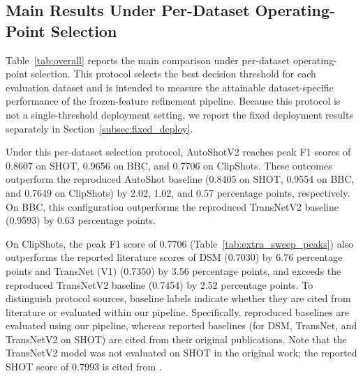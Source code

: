 \subsection{Main Results Under Per-Dataset Operating-Point Selection}
\label{subsec:main_results}

Table~\ref{tab:overall} reports the main comparison under per-dataset operating-point selection. This protocol selects the best decision threshold for each evaluation dataset and is intended to measure the attainable dataset-specific performance of the frozen-feature refinement pipeline. Because this protocol is not a single-threshold deployment setting, we report the fixed deployment results separately in Section~\ref{subsec:fixed_deploy}.

Under this per-dataset selection protocol, AutoShotV2 reaches peak F1 scores of 0.8607 on SHOT, 0.9656 on BBC, and 0.7706 on ClipShots. These outcomes outperform the reproduced AutoShot baseline (0.8405 on SHOT, 0.9554 on BBC, and 0.7649 on ClipShots) by 2.02, 1.02, and 0.57 percentage points, respectively. On BBC, this configuration outperforms the reproduced TransNetV2 baseline (0.9593) by 0.63 percentage points.

On ClipShots, the peak F1 score of 0.7706 (Table~\ref{tab:extra_sweep_peaks}) also outperforms the reported literature scores of DSM (0.7030) by 6.76 percentage points and TransNet (V1) (0.7350) by 3.56 percentage points, and exceeds the reproduced TransNetV2 baseline (0.7454) by 2.52 percentage points. To distinguish protocol sources, baseline labels indicate whether they are cited from literature or evaluated within our pipeline. Specifically, reproduced baselines are evaluated using our pipeline, whereas reported baselines (for DSM, TransNet, and TransNetV2 on SHOT) are cited from their original publications. Note that the TransNetV2 model was not evaluated on SHOT in the original work; the reported SHOT score of 0.7993 is cited from \cite{zhu2023autoshot}.

\begin{table}[!t]
\caption{F1 Score Comparison Across Evaluation Datasets}
\label{tab:overall}
\centering
\small
\renewcommand{\arraystretch}{1.08}
\vspace{0.5ex}
\end{table}

